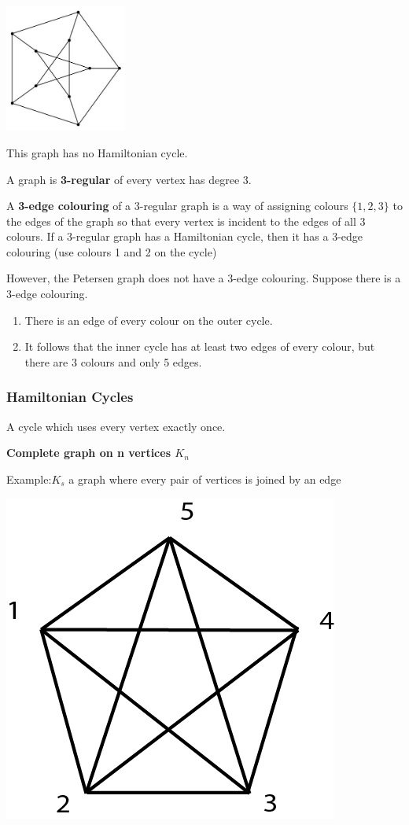 \documentclass[9pt, letterpaper, oneside]{article}
\begin{document}
\includegraphics[width=0.3\textwidth]{petersen.jpg}

This graph has no Hamiltonian cycle. 

A graph is \textbf{3-regular} of every vertex has degree 3. 

A \textbf{3-edge colouring} of a 3-regular graph is a way of assigning colours $\{1, 2, 3\}$ to the edges of the graph so that every vertex is incident to the edges of all 3 colours. If a 3-regular graph has a Hamiltonian cycle, then it has a 3-edge colouring (use colours 1 and 2 on the cycle)

However, the Petersen graph does not have a 3-edge colouring. Suppose there is a 3-edge colouring.

\begin{enumerate}
 \item There is an edge of every colour on the outer cycle.
 \item It follows that the inner cycle has at least two edges of every colour, but there are 3 colours and only 5 edges.
\end{enumerate}


\subsubsection{Hamiltonian Cycles}

A cycle which uses every vertex exactly once. 

\textbf{Complete graph on n vertices $K_n$} 

Example:$K_s$ a graph where every pair of vertices is joined by an edge 

\includegraphics{fig13.png}
\end{document}
